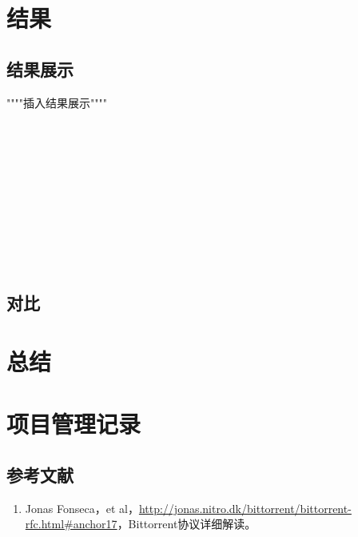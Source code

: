 \documentclass[15pt]{ctexart}
\begin{document}
    
    \section{结果} %
    \label{sec:结果}
    	\subsection{结果展示} %
    	\label{sub:结果展示}
    	\par """"插入结果展示""""
    	\\
    	\\
    	\\
    	\\
    	\\
    	\\
    	\\
    	\\
    	\\
    	\\
    	\\
    	\subsection{对比} %
    	\label{sub:对比}
    	

    \section{总结} %
    \label{sec:总结}
    
   
   \section{项目管理记录} %
   \label{sec:项目管理记录}
   

    \newpage
    \appendixpage
    \begin{appendices}
        \section{参考文献} %
            \begin{enumerate}
            	\item 	Jonas Fonseca，et al，\url{http://jonas.nitro.dk/bittorrent/bittorrent-rfc.html#anchor17}，Bittorrent协议详细解读。
            \end{enumerate}
    \end{appendices}
\end{document}
